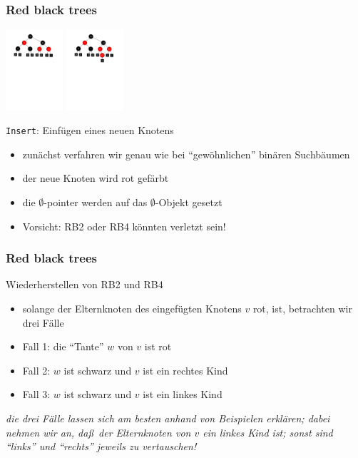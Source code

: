 \documentclass[aspectratio=1610, 11pt]{beamer}
\newcommand{\mytitle}{Red black trees}
\begin{document}
\begin{frame}\frametitle{\mytitle}
	\includegraphics[height=30mm]{./images/redblack1.pdf}
	\hfill\includegraphics[height=30mm]{./images/redblack2.pdf}
	\begin{exampleblock}{{\tt Insert}: Einf\"ugen eines neuen Knotens}
		\begin{itemize}
			\item zun\"achst verfahren wir genau wie bei ``gew\"ohnlichen'' bin\"aren Suchb\"aumen
			\item der neue Knoten wird rot gef\"arbt
			\item die $\emptyset$-pointer werden auf das $\emptyset$-Objekt gesetzt
			\item \alert{Vorsicht:} RB2 oder RB4 k\"onnten verletzt sein!
		\end{itemize}
	\end{exampleblock}
\end{frame}

\begin{frame}\frametitle{\mytitle}
	\begin{exampleblock}{Wiederherstellen von RB2 und RB4}
		\begin{itemize}
			\item solange der Elternknoten des eingef\"ugten Knotens $v$ rot, ist, betrachten wir drei F\"alle
			\item \alert{Fall 1:} die ``Tante'' $w$ von $v$ ist rot
			\item \alert{Fall 2:} $w$ ist schwarz und $v$ ist ein rechtes Kind
			\item \alert{Fall 3:} $w$ ist schwarz und $v$ ist ein linkes Kind
		\end{itemize}
		\itshape die drei F\"alle lassen sich am besten anhand von Beispielen erkl\"aren; dabei nehmen wir an, da\ss\ der Elternknoten von $v$ ein linkes Kind ist; sonst sind ``links'' und ``rechts'' jeweils zu vertauschen!
	\end{exampleblock}
\end{frame}
\end{document}
